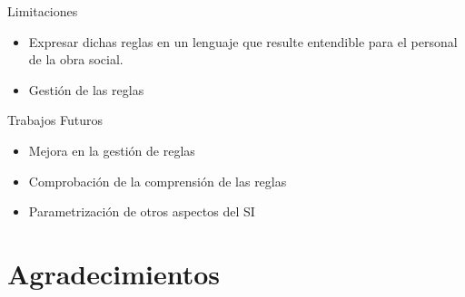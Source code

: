 \documentclass[10pt]{beamer}
\begin{document}
\begin{frame}{Limitaciones}
    \begin{itemize}
        \item Expresar dichas reglas en un lenguaje que resulte entendible para el personal de la obra social.
        \item Gestión de las reglas
    \end{itemize}
\end{frame}

\begin{frame}{Trabajos Futuros}
    \begin{itemize}
        \item Mejora en la gestión de reglas
        \item Comprobación de la comprensión de las reglas
        \item Parametrización de otros aspectos del SI
    \end{itemize}
\end{frame}

\section{Agradecimientos}
\end{document}

